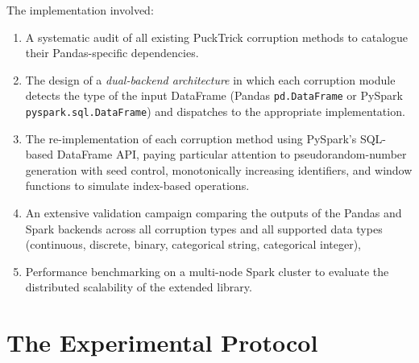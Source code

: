 \documentclass[../main.tex]{subfiles}
\begin{document}
The implementation involved:
\begin{enumerate}
    \item A systematic audit of all existing PuckTrick corruption methods to
          catalogue their Pandas-specific dependencies.
    \item The design of a \emph{dual-backend architecture} in which each
          corruption module detects the type of the input DataFrame (Pandas
          \texttt{pd.DataFrame} or PySpark \texttt{pyspark.sql.DataFrame})
          and dispatches to the appropriate implementation.
    \item The re-implementation of each corruption method using PySpark's
          SQL-based DataFrame API, paying particular attention to
          pseudorandom-number generation with seed control, monotonically
          increasing identifiers, and window functions to simulate
          index-based operations.
    \item An extensive validation campaign comparing the outputs of the Pandas
          and Spark backends across all corruption types and all supported data
          types (continuous, discrete, binary, categorical string,
          categorical integer),
    \item Performance benchmarking on a multi-node Spark cluster to evaluate
          the distributed scalability of the extended library.
\end{enumerate}

\newpage
\section{The Experimental Protocol}

\end{document}
